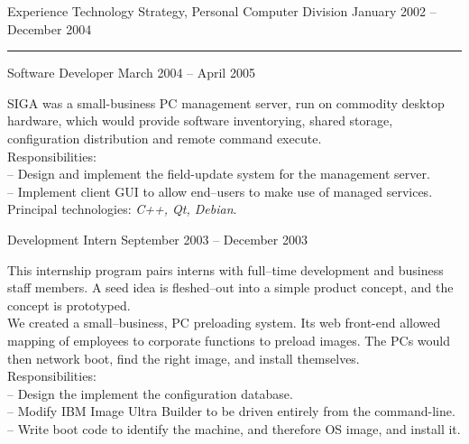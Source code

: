 \documentclass[letterpaper, 11pt]{article}
\begin{document}
\begin{resume}
\begin{category}{Experience}
                     {Technology Strategy, Personal Computer Division} {January 2002 -- December 2004}
            \rule{\textwidth}{1pt}
            \begin{block}
                 {Software Developer}
                         { }                                 {March 2004 -- April 2005}
                \par
                SIGA was a small-business PC management server, run on commodity desktop
                hardware, which would provide software inventorying, shared storage,
                configuration distribution and remote command execute.
                \\[1ex]
                Responsibilities: \\
                -- Design and implement the field-update system for the management server. \\
                -- Implement client GUI to allow end--users to make use of managed services.
                \\[1ex]
                Principal technologies: \emph{C++, Qt, Debian}.
                \smallskip
            \end{block}
            \begin{block}
                 {Development Intern}
                         { }                           {September 2003 -- December 2003}
                \par
                This internship program pairs interns with full--time development and
                business staff members.  A seed idea is fleshed--out into a simple
                product concept, and the concept is prototyped.
                \\[1ex]
                We created a small--business, PC preloading system.  Its web front-end allowed
                mapping of employees to corporate functions to preload images.  The PCs would
                then network boot, find the right image, and install themselves.
                \\[1ex]
                Responsibilities: \\
                -- Design the implement the configuration database. \\
                -- Modify IBM Image Ultra Builder to be driven entirely from the command-line. \\
                -- Write boot code to identify the machine, and therefore OS image, and install it.

\end{block}
\end{category}
\end{resume}
\end{document}
